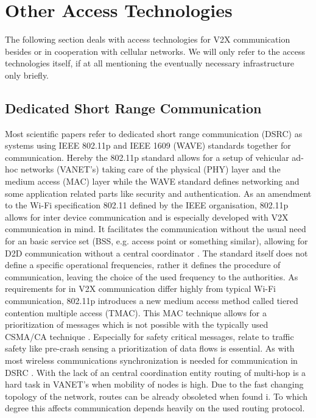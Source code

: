\documentclass[conference,12pt,onecolumn]{IEEEtran}
\begin{document}
\section{Other Access Technologies}
The following section deals with access technologies for V2X communication besides or in cooperation with cellular networks. We will only refer to the access technologies itself, if at all mentioning the eventually necessary infrastructure only briefly.
\subsection{Dedicated Short Range Communication}
Most scientific papers refer to dedicated short range communication (DSRC) as systems using IEEE 802.11p and  IEEE 1609 (WAVE) standards together for communication\cite{machardy2018}. Hereby the 802.11p standard allows for a setup of vehicular ad-hoc networks (VANET's) taking care of the physical (PHY) layer and the medium access (MAC) layer while the WAVE standard defines networking and some application related parts like security and authentication.
As an amendment to the Wi-Fi specification 802.11 defined by the IEEE organisation, 802.11p allows for inter device communication and is especially developed with V2X communication in mind. It facilitates the communication without the usual need for an basic service set (BSS, e.g. access point or something similar), allowing for D2D communication without a central coordinator \cite{machardy2018}. The standard itself does not define a specific operational frequencies, rather it defines the procedure of communication, leaving the choice of the used frequency to the authorities. As requirements for in V2X communication differ highly from typical Wi-Fi communication, 802.11p introduces a new medium access method called tiered contention multiple access (TMAC). This MAC technique allows for a prioritization of messages which is not possible with the typically used CSMA/CA technique \cite{machardy2018}. Especially for safety critical messages, relate to traffic safety like pre-crash sensing a prioritization of data flows is essential.
As with most wireless communications synchronization is needed for communication in DSRC \cite{kenney2011}. With the lack of an central coordination entity routing of multi-hop is a hard task in VANET's when mobility of nodes is high. Due to the fast changing topology of the network, routes can be already obsoleted when found i\cite{machardy2018}. To which degree this affects communication depends heavily on the used routing protocol.
\end{document}
